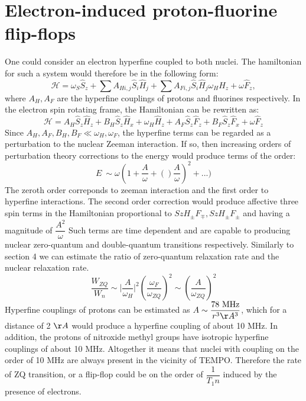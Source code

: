 \documentclass[a4paper, 12pt]{article}
\begin{document}
\section{Electron-induced proton-fluorine flip-flops}
One could consider an electron hyperfine coupled to both nuclei. The hamiltonian for such a system would therefore be in the following  form:
\begin{equation}
\mathcal{H} =  \omega_S \hat{S}_z + \sum A_{H i,j} \hat{S}_i \hat{H}_j +  \sum A_{F i,j} \hat{S}_i \hat{H}_j\omega_H \hat{H}_z + \omega \hat{F}_z ,
\end{equation}
where $A_H, A_F$ are the hyperfine couplings of protons and fluorines respectively. In the electron spin rotating frame, the Hamiltonian can be rewritten as:
\begin{equation}
\mathcal{H}  = A_H \hat{S}_z \hat{H}_z + B_H \hat{S}_z \hat{H}_x +  \omega_H \hat{H}_z + A_F \hat{S}_z \hat{F}_z + B_F \hat{S}_z \hat{F}_x + \omega \hat{F}_z
\end{equation}
Since $A_H, A_F, B_H, B_F \ll \omega_H, \omega_F $, the hyperfine terms can be regarded as a perturbation to the nuclear Zeeman interaction. If so, then increasing orders of perturbation theory corrections to the energy would produce terms of the order:
\begin{equation}
E ~ \sim \omega (1 + \dfrac{A}{\omega} + ()\dfrac{A}{\omega})^2 + ...)
\end{equation}
The zeroth order correponds to zeeman interaction and the first order to hyperfine interactions. The second order correction would produce affective three spin terms in the Hamiltonian proportional to $SzH_{\pm}F_{\mp}, SzH_{\pm}F_{\pm}$ and having a magnitude of $\dfrac{A^2}{\omega}$ Such terms are time dependent and are capable to producing nuclear zero-quantum and double-quantum transitions respectively.
Similarly to section 4 we can estimate the ratio of zero-quantum relaxation rate and the nuclear relaxation rate. 
\begin{equation}
\dfrac{W_{ZQ}}{W_n} \sim \vert \dfrac{A}{\omega_H} \vert^2 (\dfrac{\omega_F}{\omega_{ZQ}})^2 \sim (\dfrac{A}{\omega_{ZQ}})^2
\end{equation}
Hyperfine couplings of protons can be estimated as $A \sim \dfrac{78 \text{ MHz} }{r^3 \AA^3}  $, which for a distance of 2 $\AA$ would produce  a hyperfine coupling of about 10 MHz. In addition, the protons of nitroxide methyl groups have isotropic hyperfine couplings of about 10 MHz. Altogether it means that nuclei with coupling on the order of  10 MHz are always present in the vicinity of TEMPO. Therefore the rate of ZQ transition, or a flip-flop could be on the order of $\dfrac{1}{T_1n}$ induced by the presence of electrons.
\end{document}

